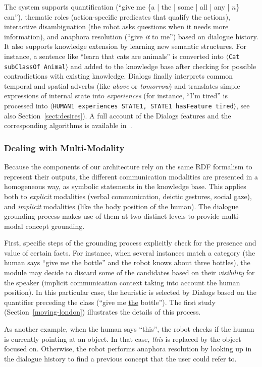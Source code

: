 \documentclass[preprint,3p,times]{elsarticle}
\newcommand{\stmt}[1]{{\footnotesize\tt$\langle$#1\relax$\rangle$}}
\begin{document}
The system supports quantification (``give me \{a | the | some | all | any |
$n$\} can''), thematic roles (action-specific predicates that qualify the
actions), interactive disambiguation (the robot asks questions when it needs
more information), and anaphora resolution (``give \emph{it} to me'') based on
dialogue history. It also supports knowledge extension by learning new semantic
structures. For instance, a sentence like ``learn that cats are animals'' is
converted into \stmt{Cat subClassOf Animal} and added to the knowledge base
after checking for possible contradictions with existing knowledge. {\sc
Dialogs} finally interprets common temporal and spatial adverbs (like
\emph{above} or \emph{tomorrow}) and translates simple expressions of internal
state  into \emph{experiences} (for instance, ``I'm tired'' is processed into
\stmt{HUMAN1 experiences STATE1, STATE1 hasFeature tired}, see also
Section~\ref{sect:desires}). A full account of the {\sc Dialogs} features and
the corresponding algorithms is available in~\cite{Lemaignan2011a}.

\subsubsection{Dealing with Multi-Modality}

Because the components of our architecture rely on the same RDF formalism to
represent their outputs, the different communication modalities are presented in
a homogeneous way, as symbolic statements in the knowledge base. This applies
both to \emph{explicit} modalities (verbal communication, deictic gestures,
social gaze), and \emph{implicit} modalities (like the body position of the
human). The dialogue grounding process makes use of them at two distinct levels
to provide multi-modal concept grounding.

First, specific steps of the grounding process explicitly check for the presence
and value of certain facts. For instance, when several instances match a
category (the human says ``give me the bottle'' and the robot knows about three
bottles), the module may decide to discard some of the candidates based on their
\emph{visibility} for the speaker (implicit communication context taking into
account the human position). In this particular case, the heuristic is selected
by {\sc Dialogs} based on the quantifier preceding the class (``give me
\underline{the} bottle''). The first study (Section~\ref{moving-london})
illustrates the details of this process.

As another example, when the human says ``this'', the robot checks if the human
is currently pointing at an object. In that case, \emph{this} is replaced by the
object focused on. Otherwise, the robot performs anaphora resolution by looking
up in the dialogue history to find a previous concept that the user could refer
to.
\end{document}
